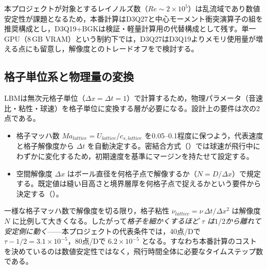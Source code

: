 本プロジェクトが対象とするレイノルズ数（\(Re\sim2\times10^5\)）は乱流域であり数値安定性が課題となるため，本番計算はD3Q27と中心モーメント衝突演算子の組を推奨構成とし，D3Q19+BGKは検証・軽量計算用の代替構成として残す。単一GPU（8\,GB VRAM）という制約下では，D3Q27はD3Q19よりメモリ使用量が増える点にも留意し，解像度とのトレードオフをで検討する。

\subsection{格子単位系と物理量の変換}
\label{sec:lattice-units}

LBMは無次元格子単位（\(\Delta x=\Delta t=1\)）で計算するため，物理パラメータ（音速比・粘性・球速）を格子単位に変換する層が必要になる。設計上の要件は次の2点である。

\begin{itemize}
	\item 格子マッハ数 \(Ma_{lattice}=U_{lattice}/c_{s,lattice}\) を0.05--0.1程度に保つよう，代表速度と格子解像度から \(\Delta t\) を自動決定する。密結合方式（）では球速が飛行中にわずかに変化するため，初期速度を基準にマージンを持たせて設定する。
	\item 空間解像度 \(\Delta x\) はボール直径を何格子点で解像するか（\(N=D/\Delta x\)）で規定する。既定値は縫い目高さと境界層厚を何格子点で捉えるかという要件から決定する（）。
\end{itemize}

一様な格子マッハ数で解像度を切る限り，格子粘性 \(\nu_{lattice}=\nu\,\Delta t/\Delta x^2\) は解像度 \(N\) に比例して大きくなる。したがって\emph{格子を細かくするほど \(\tau\) は\(1/2\)から離れて安定側に動く}——本プロジェクトの代表条件では，40点/Dで \(\tau-1/2=3.1\times10^{-5}\)，80点/Dで \(6.2\times10^{-5}\) となる。すなわち本番計算のコストを決めているのは数値安定性ではなく，飛行時間全体に必要なタイムステップ数である。
